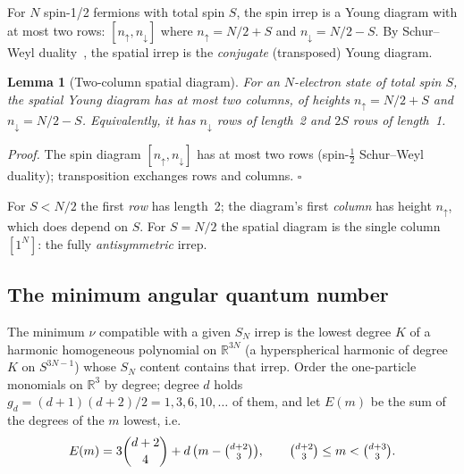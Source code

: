 \documentclass[aps,prl,twocolumn,superscriptaddress,longbibliography]{revtex4-2}
\begin{document}
For $N$ spin-1/2 fermions with total spin $S$, the spin irrep is a
Young diagram with at most two rows: $[n_\uparrow, n_\downarrow]$
where $n_\uparrow = N/2 + S$ and $n_\downarrow = N/2 - S$.  By
Schur--Weyl duality~\cite{Weyl1946, FultonHarris1991}, the spatial
irrep is the \emph{conjugate} (transposed) Young diagram.

\noindent\textbf{Lemma 1} (Two-column spatial diagram).
\label{thm:lambda1}
\textit{For an $N$-electron state of total spin $S$, the spatial Young
diagram has at most two columns, of heights $n_\uparrow = N/2 + S$ and
$n_\downarrow = N/2 - S$.  Equivalently, it has $n_\downarrow$ rows of
length~2 and $2S$ rows of length~1.}

\medskip\noindent\textit{Proof.}
The spin diagram $[n_\uparrow, n_\downarrow]$ has at most two rows
(spin-$\tfrac12$ Schur--Weyl duality); transposition exchanges rows and
columns. \hfill$\square$

\noindent For $S < N/2$ the first \emph{row} has length~2; the diagram's
first \emph{column} has height $n_\uparrow$, which does depend on $S$.
For $S = N/2$ the spatial diagram is the single column $[1^N]$: the
fully \emph{antisymmetric} irrep.

\subsection{The minimum angular quantum number}
\label{sec:nu_gs}

The minimum $\nu$ compatible with a given $S_N$ irrep is the lowest
degree $K$ of a harmonic homogeneous polynomial on $\mathbb{R}^{3N}$
(a hyperspherical harmonic of degree~$K$ on $S^{3N-1}$) whose $S_N$
content contains that irrep.  Order the one-particle monomials on
$\mathbb{R}^3$ by degree; degree $d$ holds $g_d = (d+1)(d+2)/2 = 1, 3,
6, 10, \ldots$ of them, and let $E(m)$ be the sum of the degrees of the
$m$ lowest, i.e.
\begin{equation}
  E(m) = 3\binom{d+2}{4} + d\,\bigl(m - \tbinom{d+2}{3}\bigr),
  \qquad \tbinom{d+2}{3} \le m < \tbinom{d+3}{3}.
  \label{eq:E_of_m}
\end{equation}
\end{document}

